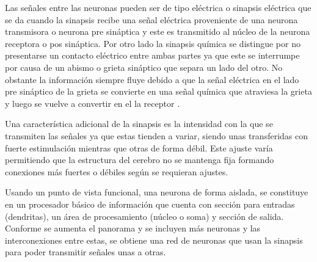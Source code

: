 		Las se\~{n}ales entre las neuronas pueden ser de tipo el\'{e}ctrica o sinapsis
	el\'{e}ctrica que se da cuando la sinapsis recibe una se\~{n}al el\'{e}ctrica proveniente
	de una neurona transmisora o neurona pre sin\'{a}ptica y este es transmitido al
	n\'{u}cleo de la neurona receptora o pos sin\'{a}ptica. Por otro lado la
	sinapsis qu\'{i}mica se distingue por no presentarse un contacto el\'{e}ctrico
	entre ambas partes ya que este se interrumpe por causa de un abismo o grieta sin\'{a}ptico que separa un lado del otro. No obstante la informaci\'{o}n siempre fluye debido a que la se\~{n}al el\'{e}ctrica en el lado pre sin\'{a}ptico de la grieta se convierte en una se\~{n}al qu\'{i}mica que atraviesa la grieta y luego se vuelve a convertir en el la receptor \cite{Kriesel2005}.
 	
 		Una caracter\'{i}stica adicional de la sinapsis es la intensidad con la que se
 	transmiten las se\~{n}ales ya que estas tienden a variar, siendo unas transferidas
 	con fuerte estimulaci\'{o}n mientras que otras de forma d\'{e}bil. Este ajuste
 	var\'{i}a permitiendo que la estructura del cerebro no se mantenga fija
 	formando conexiones m\'{a}s fuertes o d\'{e}biles seg\'{u}n se requieran ajustes.

 		Usando un punto de vista funcional, una neurona de forma aislada, se
 	constituye en un procesador b\'{a}sico de informaci\'{o}n que cuenta con secci\'{o}n para
 	entradas (dendritas), un \'{a}rea de procesamiento (n\'{u}cleo o soma) y secci\'{o}n de
 	salida. Conforme se aumenta el panorama y se incluyen m\'{a}s neuronas y las interconexiones entre estas, se obtiene una red de neuronas que usan la sinapsis para poder transmitir se\~{n}ales unas a otras.
 		
 		
